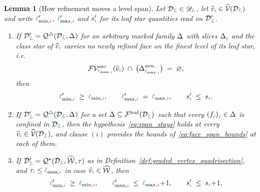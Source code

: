 \documentclass[a4paper, 12pt]{article}
\makeatletter
\newcommand{\quadriF}{\mathcal{Q}^{\triangle}}                   %
\newcommand{\quadriV}{\mathcal{Q}^{\star}}                       %
\newcommand{\quadriVup}[1]{\quadriV_{\rightarrow #1}}            %
\newcommand{\lminIdx}[1]{\l_{\min,#1}}
\newcommand{\lmaxIdx}[1]{\l_{\max,#1}}
\newcommand{\levelSpan}[1]{s_{#1}}
\newcommand{\targetlevel}{\tau}                                 %
\newcommand{\green}{\color{ForestGreen}}
\newcommand{\brickred}{\color{BrickRed}}
\newcommand{\V}{\mathcal{V}}
\newcommand{\F}{\mathcal{F}}
\DeclareRobustCommand{\simplexsubsetTwo}[2][]{\Delta\ifx\@empty#1\@empty\else^{#1}\fi_{#2}}
\DeclareRobustCommand{\simplexsubsetNew}[2][]{\Delta^{\mathrm{new}\ifx\@empty#1\@empty\else,#1\fi}_{#2}}
\newcommand{\vertexClass}[1]{\widehat{v}_{#1}}
\newcommand{\vertexClasses}{\widehat{\V}}
\DeclareRobustCommand{\markedVertexClasses}[1][]{\widehat{\mathcal{W}}\ifx\@empty#1\@empty\else^{#1}\fi}
\newcommand{\face}[2]{\freeQ{f}{}{#1}{#2}}
\newcommand{\coarseIdxone}{{\brickred i}}
\newcommand{\fineIdxone}{{\brickred j}}
\renewcommand{\l}{{\green\ell}}
\renewcommand{\L}{{\green L}}
\newcommand{\freeQ}[4]{ ( {#1}^{#2}_{#3} )_{#4}}
\newtheorem{lemma}[theorem]{Lemma}
\theoremstyle{definition}
\theoremstyle{plain}
\numberwithin{equation}{section}
\newcommand{\tobecut}[1]{{\color{red} #1}}     %
\DeclareRobustCommand{\domseq}[1][]{\mathcal{D}\ifx\@empty#1\@empty\else_{#1}\fi}
\newcommand{\alldomseqs}{\mathscr{D}}
\newcommand{\leafF}[1]{\F^{\mathrm{leaf}}_{#1}}             %
\newcommand{\FVanc}[1]{\F\V^{\mathrm{anc}}_{#1}}            %
\makeatother
\begin{document}
\begin{lemma}[How refinement moves a level span]
    \label{lemma:span_opens}
    Let $\domseq[\L] \in \alldomseqs_\L$, let $\vertexClass{\coarseIdxone} \in \vertexClasses(\domseq[\L])$ and write $\lminIdx{\coarseIdxone}'$, $\lmaxIdx{\coarseIdxone}'$ and $\levelSpan{\coarseIdxone}'$ for its leaf star quantities read on $\domseq[\L]'$.
    \begin{enumerate}[topsep=3pt, itemsep=-2pt]
        \item[$(i)$] If $\domseq[\L]' = \quadriF(\domseq[\L], \simplexsubsetTwo{})$ for an arbitrary marked family $\simplexsubsetTwo{}$ with slices $\simplexsubsetTwo{\l}$ and the class star of $\vertexClass{\coarseIdxone}$ carries no newly refined face on the finest level of its leaf star, i.e.
        \begin{equation}
            \label{eq:span_stays}
            \FVanc{\lmaxIdx{\coarseIdxone}} ( \vertexClass{\coarseIdxone} ) \; \cap \; \big( \simplexsubsetNew{\lmaxIdx{\coarseIdxone}} \big) \; = \; \varnothing ,
        \end{equation}
        then
        \begin{equation}
            \label{eq:face_span_bounds}
            \lminIdx{\coarseIdxone}' \; \geq \; \lminIdx{\coarseIdxone}, \qquad \lmaxIdx{\coarseIdxone}' \; = \; \lmaxIdx{\coarseIdxone}, \qquad  \levelSpan{\coarseIdxone}' \; \leq \; \levelSpan{\coarseIdxone} .
        \end{equation}
        \item[$(ii)$] If $\domseq[\L]' = \quadriF(\domseq[\L], \simplexsubsetTwo{})$ for a set $\simplexsubsetTwo{} \subseteq \leafF{}(\domseq[\L])$ such that every $\face{\l}{\fineIdxone} \in \simplexsubsetTwo{}$ is confined in $\domseq[\L]$, then the hypothesis~\eqref{eq:span_stays} holds at every $\vertexClass{\coarseIdxone} \in \vertexClasses(\domseq[\L])$, and clause $(i)$ provides the bounds of~\eqref{eq:face_span_bounds} at each of them.
        \item[$(iii)$] If $\domseq[\L]' = \quadriV(\domseq[\L], \markedVertexClasses, \targetlevel)$ as in Definition~\ref{def:graded_vertex_quadrisection}, and $\targetlevel_\coarseIdxone \leq \lmaxIdx{\coarseIdxone}$ in case $\vertexClass{\coarseIdxone} \in \markedVertexClasses$, then
        \begin{equation}
            \label{eq:span_bounds}
            \lminIdx{\coarseIdxone}' \; \geq \; \lminIdx{\coarseIdxone}, \qquad \lmaxIdx{\coarseIdxone}' \; \leq \; \lmaxIdx{\coarseIdxone} \! + \! 1, \qquad \levelSpan{\coarseIdxone}' \; \leq \; \levelSpan{\coarseIdxone} \! + \! 1 ,

\end{equation}
\end{enumerate}
\end{lemma}
\end{document}
